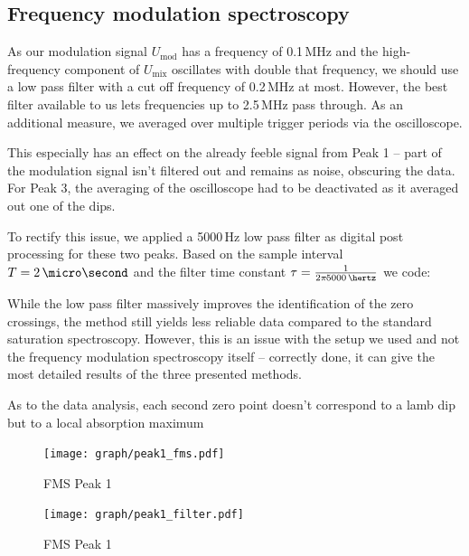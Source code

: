 \newpage
\subsection{Frequency modulation spectroscopy}

As our modulation signal $U_\text{mod}$ has a frequency of 0.1\,MHz and the high-frequency component of $U_\text{mix}$ oscillates with double that frequency, we should use a low pass filter with a cut off frequency of 0.2\,MHz at most. However,  the best filter available to us lets frequencies  up to 2.5\,MHz pass through. As an additional measure, we averaged over multiple trigger periods via the oscilloscope.

This especially has an effect on the already feeble signal from Peak 1 -- part of the modulation signal isn't filtered out and remains as noise, obscuring the data. For Peak 3, the averaging of the oscilloscope had to be deactivated as it averaged out one of the dips.

To rectify this issue, we applied a 5000\,Hz low pass filter as digital post processing for these two peaks. Based on the sample interval $T = 2\,\micro\second$ and the filter time constant $\tau = \frac{1}{2 \pi \cdt 5000\,\hertz}$ we code:



While the low pass filter massively improves the identification of the zero crossings, the method still yields less reliable data compared to the standard saturation spectroscopy. However, this is an issue with the setup we used and not the frequency modulation spectroscopy itself -- correctly done, it can give the most detailed results of the three presented methods.

As to the data analysis, each second zero point doesn't correspond to a lamb dip but to a local absorption maximum

\begin{figure}[p]
	\centering
	\texttt{[image: graph/peak1\_fms.pdf]}
	\vspace{-2ex}
	\caption{FMS Peak 1}
	\label{fig:P1_fms}
	\vspace{2ex}

	\texttt{[image: graph/peak1\_filter.pdf]}
	\vspace{-2ex}
	\caption{FMS Peak 1}
	\label{fig:P1_filter}
	\vspace{-2em}
\end{figure}

